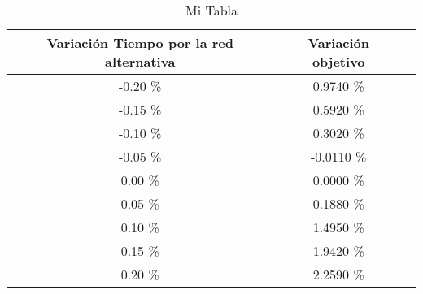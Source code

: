 \begin{table}
\centering
\begin{tabular}{|c|c|c|}
\hline
 Variación Tiempo por la red alternativa & Variación objetivo \\ \hline
-0.20 \% & 0.9740 \% \\ \hline
-0.15 \% & 0.5920 \% \\ \hline
-0.10 \% & 0.3020 \% \\ \hline
-0.05 \% & -0.0110 \% \\ \hline
0.00 \% & 0.0000 \% \\ \hline
0.05 \% & 0.1880 \% \\ \hline
0.10 \% & 1.4950 \% \\ \hline
0.15 \% & 1.9420 \% \\ \hline
0.20 \% & 2.2590 \% \\ \hline
\end{tabular}
\caption{Mi Tabla}
\end{table}
